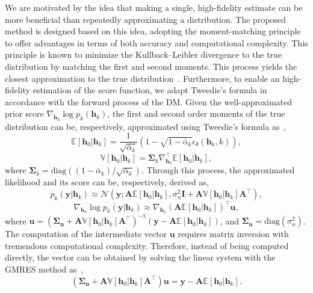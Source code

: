 \documentclass[lettersize,journal]{IEEEtran}
\begin{document}
We are motivated by the idea that making a single, high-fidelity estimate can be more beneficial than repeatedly approximating a distribution. The proposed method is designed based on this idea, adopting the moment-matching principle to offer advantages in terms of both accuracy and computational complexity. This principle is known to minimize the Kullback–Leibler divergence to the true distribution by matching the first and second moments. This process yields the closest approximation to the true distribution~\cite{bishopPatternRecognitionMachine2006}. Furthermore, to enable an high-fidelity estimation of the score function, we adapt Tweedie’s formula in accordance with the forward process of the DM.
Given the well-approximated prior score $\nabla_{\mathbf{h}_{k}}\log p_{k}(\mathbf{h}_{k})$, the first and second order moments of the true distribution can be, respectively, approximated using Tweedie's formula as~\cite{efronTweediesFormulaSelection2011},
\begin{equation}
\label{eq:first_moment}
\mathbb{E}[\mathbf{h}_{0}|\mathbf{h}_{k}] = \frac{1}{\sqrt{ \bar{\alpha}_{k} }}(1-\sqrt{ 1-\bar{\alpha}_{k} }\epsilon_{\theta}(\mathbf{h}_{k},k)),
\end{equation}
\begin{equation}
\label{eq:second_moment}
\mathbb{V}[\mathbf{h}_{0}|\mathbf{h}_{k}] = \boldsymbol{\Sigma}_{k}\nabla_{\mathbf{h}_{k}}^{\top}\mathbb{E}[\mathbf{h}_{0}|\mathbf{h}_{k}],
\end{equation}
where $\boldsymbol{\Sigma}_{k} = \text{diag}((1-\bar{\alpha}_{k}) / \sqrt{ \bar{\alpha}_{k} })$. Through this process, the approximated likelihood and its score can be, respectively, derived as,
\begin{equation}
\label{eq:likelihood_approx}
p_{k}(\mathbf{y}|\mathbf{h}_{k}) \approx \mathcal{N}(\mathbf{y}; \mathbf{A}\mathbb{E}[\mathbf{h}_{0}|\mathbf{h}_{k}], \sigma_{n}^{2}\mathbf{I}+\mathbf{A}\mathbb{V}[\mathbf{h}_{0}|\mathbf{h}_{k}]\mathbf{A}^{\top}),
\end{equation}
\begin{equation}
\label{eq:likelihood_score_approx}
\nabla_{\mathbf{h}_{k}}\log p_{k}(\mathbf{y}|\mathbf{h}_{k}) \approx \nabla_{\mathbf{h}_{k}} (\mathbf{A}\mathbb{E}[\mathbf{h}_{0}|\mathbf{h}_{k}])^{\top}\mathbf{u},
\end{equation}
where $\mathbf{u} = (\boldsymbol{\Sigma}_{\mathbf{n}}+\mathbf{A}\mathbb{V}[\mathbf{h}_{0}|\mathbf{h}_{k}]\mathbf{A}^{\top})^{-1}(\mathbf{y}- \mathbf{A}\mathbb{E}[\mathbf{h}_{0}|\mathbf{h}_{k}])$, and $\boldsymbol{\Sigma}_{\mathbf{n}} = \text{diag}(\sigma_{n}^{2})$. The computation of the intermediate vector $\mathbf{u}$ requires matrix inversion with tremendous computational complexity. Therefore, instead of being computed directly, the vector can be obtained by solving the linear system with the GMRES method as~\cite{saadGMRESGeneralizedMinimal1986},
\begin{equation}
\label{eq:linear_system}
(\boldsymbol{\Sigma}_{\mathbf{n}}+\mathbf{A}\mathbb{V}[\mathbf{h}_{0}|\mathbf{h}_{k}]\mathbf{A}^{\top})\mathbf{u} = \mathbf{y}- \mathbf{A}\mathbb{E}[\mathbf{h}_{0}|\mathbf{h}_{k}].
\end{equation}
\end{document}
